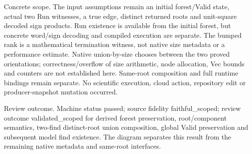\documentclass[10pt]{article}
\begin{document}
Concrete scope. The input assumptions remain an initial forest/Valid state, actual two Run witnesses, a true edge, distinct returned roots and unit-square decoded sign products. Run existence is available from the initial forest, but concrete word/sign decoding and compiled execution are separate. The bumped rank is a mathematical termination witness, not native size metadata or a performance estimate. Native union-by-size chooses between the two proved orientations; correctness/overflow of size arithmetic, node allocation, Vec bounds and counters are not established here. Same-root composition and full runtime bindings remain separate. No scientific execution, cloud action, repository edit or producer-snapshot mutation occurred.\par\medskip
Review outcome. Machine status passed; source fidelity faithful\_scoped; review outcome validated\_scoped for derived forest preservation, root/component semantics, two-find distinct-root union composition, global Valid preservation and subsequent model find existence. The diagram separates this result from the remaining native metadata and same-root interfaces.\par\medskip
\end{document}
